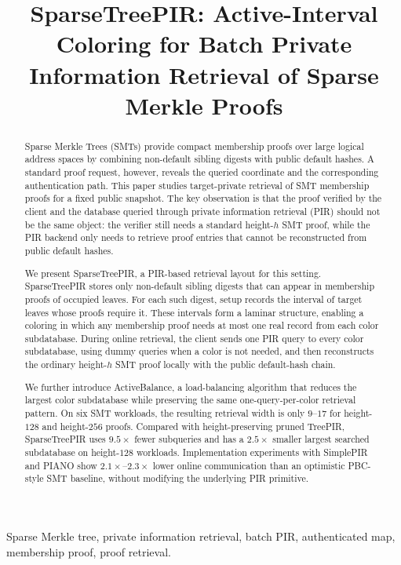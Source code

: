 \documentclass[conference,compsoc]{IEEEtran}
\title{SparseTreePIR: Active-Interval Coloring for Batch Private Information Retrieval of Sparse Merkle Proofs}
\author{\IEEEauthorblockN{Anonymous Author(s)}}
\newcommand{\ActiveBalance}{\mbox{ActiveBalance}}
\begin{document}
\maketitle

\begin{abstract}
Sparse Merkle Trees (SMTs) provide compact membership proofs over large logical address spaces by combining non-default sibling digests with public default hashes. A standard proof request, however, reveals the queried coordinate and the corresponding authentication path. This paper studies target-private retrieval of SMT membership proofs for a fixed public snapshot. The key observation is that the proof verified by the client and the database queried through private information retrieval (PIR) should not be the same object: the verifier still needs a standard height-$h$ SMT proof, while the PIR backend only needs to retrieve proof entries that cannot be reconstructed from public default hashes.

We present SparseTreePIR, a PIR-based retrieval layout for this setting. SparseTreePIR stores only non-default sibling digests that can appear in membership proofs of occupied leaves. For each such digest, setup records the interval of target leaves whose proofs require it. These intervals form a laminar structure, enabling a coloring in which any membership proof needs at most one real record from each color subdatabase. During online retrieval, the client sends one PIR query to every color subdatabase, using dummy queries when a color is not needed, and then reconstructs the ordinary height-$h$ SMT proof locally with the public default-hash chain.

We further introduce \ActiveBalance{}, a load-balancing algorithm that reduces the largest color subdatabase while preserving the same one-query-per-color retrieval pattern. On six SMT workloads, the resulting retrieval width is only $9$--$17$ for height-$128$ and height-$256$ proofs. Compared with height-preserving pruned TreePIR, SparseTreePIR uses $9.5\times$ fewer subqueries and has a $2.5\times$ smaller largest searched subdatabase on height-$128$ workloads. Implementation experiments with SimplePIR and PIANO show $2.1\times$--$2.3\times$ lower online communication than an optimistic PBC-style SMT baseline, without modifying the underlying PIR primitive.
\end{abstract}

\begin{IEEEkeywords}
Sparse Merkle tree, private information retrieval, batch PIR, authenticated map, membership proof, proof retrieval.
\end{IEEEkeywords}


\end{document}
